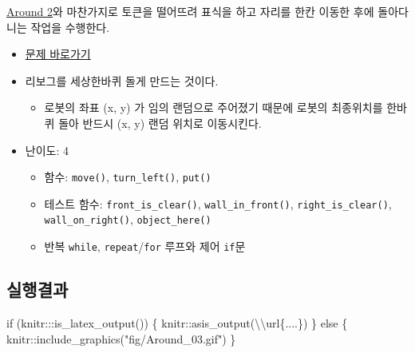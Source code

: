 \documentclass[
  b5paperpaper,
  DIV=11,
  numbers=noendperiod]{scrreprt}
\newenvironment{Shaded}{\begin{snugshade}}{\end{snugshade}}
\newcommand{\ControlFlowTok}[1]{\textcolor[rgb]{0.00,0.23,0.31}{#1}}
\newcommand{\FunctionTok}[1]{\textcolor[rgb]{0.28,0.35,0.67}{#1}}
\newcommand{\NormalTok}[1]{\textcolor[rgb]{0.00,0.23,0.31}{#1}}
\newcommand{\SpecialCharTok}[1]{\textcolor[rgb]{0.37,0.37,0.37}{#1}}
\newcommand{\StringTok}[1]{\textcolor[rgb]{0.13,0.47,0.30}{#1}}
\providecommand{\tightlist}{%
  \setlength{\itemsep}{0pt}\setlength{\parskip}{0pt}}\usepackage{longtable,booktabs,array}
\begin{document}
\protect\hyperlink{around-02}{Around 2}와 마찬가지로 토큰을 떨어뜨려
표식을 하고 자리를 한칸 이동한 후에 돌아다니는 작업을 수행한다.

\begin{itemize}
\tightlist
\item
  \href{https://reeborg.ca/reeborg.html?lang=ko-en\&mode=python\&menu=worlds\%2Fmenus\%2Freeborg_intro_en.json\&name=Around\%203\&url=worlds\%2Ftutorial_en\%2Faround3.json}{문제
  바로가기}
\item
  리보그를 세상한바퀴 돌게 만드는 것이다.

  \begin{itemize}
  \tightlist
  \item
    로봇의 좌표 (x, y) 가 임의 랜덤으로 주어졌기 때문에 로봇의
    최종위치를 한바퀴 돌아 반드시 (x, y) 랜덤 위치로 이동시킨다.
  \end{itemize}
\item
  난이도: 4

  \begin{itemize}
  \tightlist
  \item
    함수: \texttt{move()}, \texttt{turn\_left()}, \texttt{put()}
  \item
    테스트 함수: \texttt{front\_is\_clear()},
    \texttt{wall\_in\_front()}, \texttt{right\_is\_clear()},
    \texttt{wall\_on\_right()}, \texttt{object\_here()}
  \item
    반복 \texttt{while}, \texttt{repeat}/\texttt{for} 루프와 제어
    \texttt{if}문
  \end{itemize}
\end{itemize}

\hypertarget{uxc2e4uxd589uxacb0uxacfc-7}{%
\subsection{실행결과}\label{uxc2e4uxd589uxacb0uxacfc-7}}

\begin{Shaded}
\begin{Highlighting}[]
\ControlFlowTok{if}\NormalTok{ (knitr}\SpecialCharTok{:::}\FunctionTok{is\_latex\_output}\NormalTok{()) \{}
\NormalTok{  knitr}\SpecialCharTok{::}\FunctionTok{asis\_output}\NormalTok{(}\StringTok{\textquotesingle{}}\SpecialCharTok{\textbackslash{}\textbackslash{}}\StringTok{url\{....\}\textquotesingle{}}\NormalTok{)}
\NormalTok{\} }\ControlFlowTok{else}\NormalTok{ \{}
\NormalTok{  knitr}\SpecialCharTok{::}\FunctionTok{include\_graphics}\NormalTok{(}\StringTok{"fig/Around\_03.gif"}\NormalTok{)}
\NormalTok{\}}
\end{Highlighting}
\end{Shaded}
\end{document}
